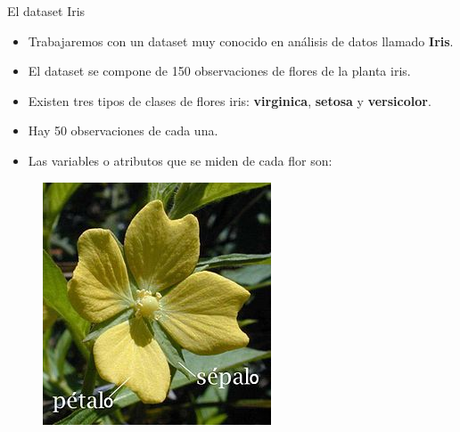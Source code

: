 \documentclass[handout]{beamer}
\begin{document}
\begin{frame}{El dataset Iris}
\scriptsize{
\begin{itemize}
 \item Trabajaremos con un dataset muy conocido en análisis de datos llamado \textbf{Iris}.
 \item El dataset se compone de 150 observaciones de flores de la planta iris. 
 \item Existen tres tipos de clases de flores iris: \textbf{virginica}, \textbf{setosa} y \textbf{versicolor}.
 \item Hay 50 observaciones de cada una.
\item Las variables o atributos que se miden de cada flor son:


 
\end{itemize}


\begin{figure}[h!]
	\centering
	\includegraphics[scale=1.2]{imagenes/petalosepalo.jpg}
	
	
\end{figure}

}

\end{frame}
\end{document}
